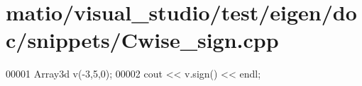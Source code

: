 \hypertarget{matio_2visual__studio_2test_2eigen_2doc_2snippets_2_cwise__sign_8cpp_source}{}\section{matio/visual\+\_\+studio/test/eigen/doc/snippets/\+Cwise\+\_\+sign.cpp}
\label{matio_2visual__studio_2test_2eigen_2doc_2snippets_2_cwise__sign_8cpp_source}

\begin{DoxyCode}
00001 Array3d v(-3,5,0);
00002 cout << v.sign() << endl;
\end{DoxyCode}
